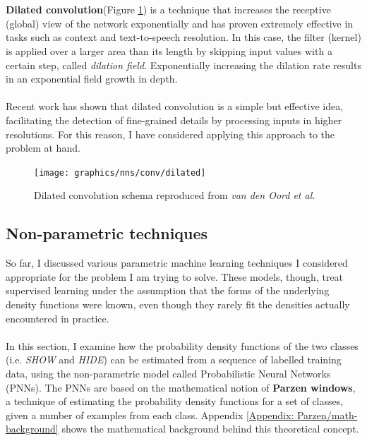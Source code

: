 	\\ \\
	\textbf{Dilated convolution}(Figure \ref{Fig: prep/ml/cnn/dilated}) is a technique that increases the receptive (global) view of the network exponentially and has proven extremely effective in tasks such as context and text-to-speech resolution. In this case, the filter (kernel) is applied over a larger area than its length by skipping input values with a certain step, called \textit{dilation field}. Exponentially increasing the dilation rate results in an exponential field growth in depth\cite{DBLP:journals/corr/YuK15}.  
	\\ \\
	Recent work has shown that dilated convolution is a simple but effective idea, facilitating the detection of fine-grained details by processing inputs in higher resolutions. For this reason, I have considered applying this approach to the problem at hand.
	
	\begin{figure}[H]
		\centering
		\texttt{[image: graphics/nns/conv/dilated]}
		\caption[Dilated convolution]{Dilated convolution schema reproduced from \textit{van den Oord et al.} \citep{DBLP:journals/corr/OordDZSVGKSK16}}
		\label{Fig: prep/ml/cnn/dilated}
	\end{figure}
	
	\subsection{Non-parametric techniques}	\label{Section 2.2.5}
	So far, I discussed various parametric machine learning techniques I considered appropriate for the problem I am trying to solve. These models, though, treat supervised learning under the assumption that the forms of the underlying density functions were known, even though they rarely fit the densities actually encountered in practice. 
	\\ \\
	In this section, I examine how the probability density functions of the two classes (i.e. \textit{SHOW} and \textit{HIDE}) can be estimated from a sequence of labelled training data, using the non-parametric model called Probabilistic Neural Networks (PNNs). The PNNs are based on the mathematical notion of \textbf{Parzen windows}, a technique of estimating the probability density functions for a set of classes, given a number of examples from each class. Appendix \ref{Appendix: Parzen/math-background} shows the mathematical background behind this theoretical concept.
	
